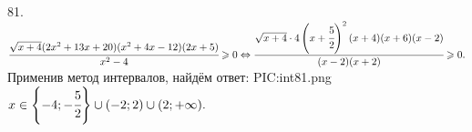 81. $\cfrac{\sqrt{x+4}(2x^2+13x+20)(x^2+4x-12)(2x+5)}{x^2-4}\geqslant0\Leftrightarrow \cfrac{\sqrt{x+4}\cdot4\left(x+\cfrac{5}{2}\right)^2(x+4)(x+6)(x-2)}{(x-2)(x+2)}\geqslant0.$ Применив метод интервалов, найдём ответ:
{{PIC:int81.png}}
$x\in\left\{-4;-\cfrac{5}{2}\right\}\cup(-2;2)\cup(2;+\infty).$\\
